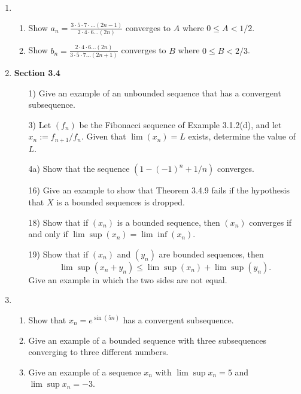 \documentclass[12pt,letterpaper]{article}
\theoremstyle{case}
\theoremstyle{definition}
\begin{document}
\begin{enumerate}
	\item 
	\begin{enumerate}
		\item Show $a_n=\frac{3 \cdot 5 \cdot 7 \cdot \dots (2n-1)}{2 \cdot 4 \cdot 6 \dots (2n)}$ converges to $A$ where $0 \leq A < 1/2$.
		
		\item Show $b_n = \frac{2 \cdot 4 \cdot 6 \dots (2n)}{3 \cdot 5 \cdot 7 \dots (2n+1)}$ converges to $B$ where $0 \leq B < 2/3$.
	\end{enumerate}

	\item \textbf{Section 3.4}
	\begin{enumerate}
		\item[1)] Give an example of an unbounded sequence that has a convergent subsequence.
		
		\item[3)] Let $(f_n)$ be the Fibonacci sequence of Example 3.1.2(d), and let $x_n := f_{n+1}/f_n$. Given that $\lim (x_n) =L$ exists, determine the value of $L$.
		
		\item[4a)] Show that the sequence $(1-(-1)^n+1/n)$ converges.
		
		\item[16)] Give an example to show that Theorem 3.4.9 fails if the hypothesis that $X$ is a bounded sequences is dropped.
		
		\item[18)] Show that if $(x_n)$ is a bounded sequence, then $(x_n)$ converges if and only if $\lim \sup (x_n) = \lim \inf (x_n)$.
		
		\item[19)] Show that if $(x_n)$ and $(y_n)$ are bounded sequences, then
		\[\lim \sup (x_n + y_n) \leq \lim \sup (x_n) + \lim \sup (y_n).\]
		Give an example in which the two sides are not equal.
	\end{enumerate}
	\item 
	\begin{enumerate}
		\item Show that $x_n=e^{\sin (5n)}$ has a convergent subsequence.
		
		\item Give an example of a bounded sequence with three subsequences converging to three different numbers.
		
		\item Give an example of a sequence $x_n$ with $\lim \sup x_n = 5$ and $\lim \sup x_n = -3$.
		

\end{enumerate}
\end{enumerate}
\end{document}
